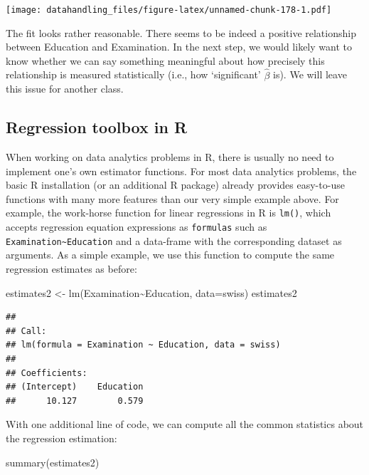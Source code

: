 \documentclass[
  12pt,
]{style/krantz}
\newenvironment{Shaded}{\begin{snugshade}}{\end{snugshade}}
\newcommand{\AttributeTok}[1]{\textcolor[rgb]{0.77,0.63,0.00}{#1}}
\newcommand{\FunctionTok}[1]{\textcolor[rgb]{0.00,0.00,0.00}{#1}}
\newcommand{\NormalTok}[1]{#1}
\newcommand{\OtherTok}[1]{\textcolor[rgb]{0.56,0.35,0.01}{#1}}
\newcommand{\SpecialCharTok}[1]{\textcolor[rgb]{0.00,0.00,0.00}{#1}}
\begin{document}
\texttt{[image: datahandling\_files/figure-latex/unnamed-chunk-178-1.pdf]}

The fit looks rather reasonable. There seems to be indeed a positive relationship between Education and Examination. In the next step, we would likely want to know whether we can say something meaningful about how precisely this relationship is measured statistically (i.e., how `significant' \(\hat{\beta}\) is). We will leave this issue for another class.

\hypertarget{regression-toolbox-in-r}{%
\subsection{Regression toolbox in R}\label{regression-toolbox-in-r}}

When working on data analytics problems in R, there is usually no need to implement one's own estimator functions. For most data analytics problems, the basic R installation (or an additional R package) already provides easy-to-use functions with many more features than our very simple example above. For example, the work-horse function for linear regressions in R is \texttt{lm()}, which accepts regression equation expressions as \texttt{formulas} such as \texttt{Examination\textasciitilde{}Education} and a data-frame with the corresponding dataset as arguments. As a simple example, we use this function to compute the same regression estimates as before:

\begin{Shaded}
\begin{Highlighting}[]
\NormalTok{estimates2 }\OtherTok{\textless{}{-}} \FunctionTok{lm}\NormalTok{(Examination}\SpecialCharTok{\textasciitilde{}}\NormalTok{Education, }\AttributeTok{data=}\NormalTok{swiss)}
\NormalTok{estimates2}
\end{Highlighting}
\end{Shaded}

\begin{verbatim}
## 
## Call:
## lm(formula = Examination ~ Education, data = swiss)
## 
## Coefficients:
## (Intercept)    Education  
##      10.127        0.579
\end{verbatim}

With one additional line of code, we can compute all the common statistics about the regression estimation:

\begin{Shaded}
\begin{Highlighting}[]
\FunctionTok{summary}\NormalTok{(estimates2)}
\end{Highlighting}
\end{Shaded}
\end{document}
